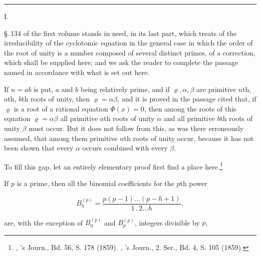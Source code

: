 \begin{center}
{\Large {}}

\rule{4em}{0.4pt}

I.

\textbf{}
\end{center}

\S.\,134 of the first volume stands in need, in its last part, which treats of the irreducibility of the cyclotomic equation in the general case in which the order of the root of unity is a number composed of several distinct primes, of a correction, which shall be supplied here; and we ask the reader to complete the passage named in accordance with what is set out here.

If $n=ab$ is put, $a$ and $b$ being relatively prime, and if $\varrho, \alpha, \beta$ are primitive $n$th, $a$th, $b$th roots of unity, then $\varrho=\alpha\beta$, and it is proved in the passage cited that, if $\varrho$ is a root of a rational equation $\Phi(x)=0$, then among the roots of this equation $\varrho=\alpha\beta$ all primitive $a$th roots of unity $\alpha$ and all primitive $b$th roots of unity $\beta$ must occur. But it does not follow from this, as was there erroneously assumed, that among them  primitive $n$th roots of unity occur, because it has not been shown that every $\alpha$ occurs combined with every $\beta$.

To fill this gap, let an entirely elementary proof first find a place here.\footnote{, 's Journ., Bd. 56, S. 178 (1859). , 's Journ., 2. Ser., Bd. 4, S. 105 (1859).}

If $p$ is a prime, then all the binomial coefficients for the $p$th power

\[
B_h^{(p)} = \dfrac{p(p-1)\ldots(p-h+1)}{1\,.\,2\ldots h},
\]

are, with the exception of $B_0^{(p)}$ and $B_p^{(p)}$, integers divisible by $p$,
